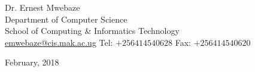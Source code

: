 \begin{titlepage}
\begin{center}
Dr. Ernest Mwebaze \\
\vspace{1em}
Department of Computer Science\\
School of Computing \& Informatics Technology \\
\url{emwebaze@cis.mak.ac.ug} Tel: $+256414540628$ Fax: $+256414540620$


\vfill

February, 2018

\end{center}

\end{titlepage}
